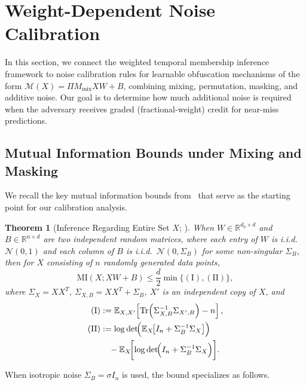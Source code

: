 \documentclass[letterpaper]{article} %
\newtheorem{theorem}{Theorem}
\newcommand{\MI}{\mathrm{MI}}
\begin{document}
\section{Weight-Dependent Noise Calibration}

In this section, we connect the weighted temporal membership inference framework to noise calibration rules for learnable obfuscation mechanisms of the form $\mathcal{M}(X) = \Pi M_{\mathrm{mix}} X W + B$, combining mixing, permutation, masking, and additive noise. Our goal is to determine how much additional noise is required when the adversary receives graded (fractional-weight) credit for near-miss predictions.

\subsection{Mutual Information Bounds under Mixing and Masking}

We recall the key mutual information bounds from~\cite{xiao2024formal} that serve as the starting point for our calibration analysis.

\begin{theorem}[Inference Regarding Entire Set $X$; {\cite[Theorem~2]{xiao2024formal}}]
\label{thm:mi_masking}
When $W \in \mathbb{R}^{d_0 \times d}$ and $B \in \mathbb{R}^{n \times d}$ are two independent random matrices, where each entry of $W$ is i.i.d.\ $\mathcal{N}(0,1)$ and each column of $B$ is i.i.d.\ $\mathcal{N}(0, \Sigma_B)$ for some non-singular $\Sigma_B$, then for $X$ consisting of $n$ randomly generated data points,
\begin{equation}
\label{eq:mi_masking_bound}
\MI(X; XW + B) \le \frac{d}{2} \min \{ \mathrm{(I)}, \mathrm{(II)} \},
\end{equation}
where $\Sigma_X = XX^T$, $\Sigma_{X,B} = XX^T + \Sigma_B$, $X'$ is an independent copy of $X$, and
\begin{align*}
\mathrm{(I)} &:= \mathbb{E}_{X,X'}\!\left[
\mathrm{Tr}\!\left(
\Sigma_{X,B}^{-1}\Sigma_{X',B}
\right) - n
\right], \\
\mathrm{(II)} &:= \log \det\!\Bigl(
\mathbb{E}_X\!\bigl[
I_n + \Sigma_B^{-1}\Sigma_X
\bigr]
\Bigr) \\
&\quad - \mathbb{E}_X\!\biggl[
\log \det\!\Bigl(
I_n + \Sigma_B^{-1}\Sigma_X
\Bigr)
\biggr].
\end{align*}
\end{theorem}

When isotropic noise $\Sigma_B = \sigma I_n$ is used, the bound specializes as follows.
\end{document}
